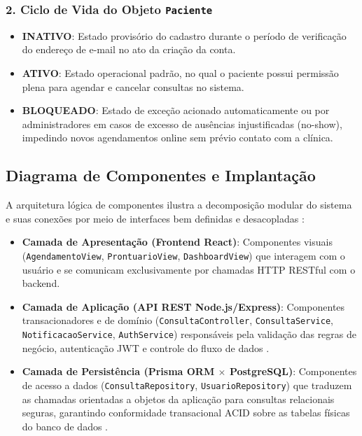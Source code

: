 \subsubsection{2. Ciclo de Vida do Objeto \texttt{Paciente}}
\begin{itemize}
    \item \textbf{INATIVO}: Estado provisório do cadastro durante o período de verificação do endereço de e-mail no ato da criação da conta.
    \item \textbf{ATIVO}: Estado operacional padrão, no qual o paciente possui permissão plena para agendar e cancelar consultas no sistema.
    \item \textbf{BLOQUEADO}: Estado de exceção acionado automaticamente ou por administradores em casos de excesso de ausências injustificadas (no-show), impedindo novos agendamentos online sem prévio contato com a clínica.
\end{itemize}

\subsection{Diagrama de Componentes e Implantação}

A arquitetura lógica de componentes ilustra a decomposição modular do sistema e suas conexões por meio de interfaces bem definidas e desacopladas \cite{fowler2002}:
\begin{itemize}
    \item \textbf{Camada de Apresentação (Frontend React)}: Componentes visuais (\texttt{AgendamentoView}, \texttt{ProntuarioView}, \texttt{DashboardView}) que interagem com o usuário e se comunicam exclusivamente por chamadas HTTP RESTful com o backend.
    \item \textbf{Camada de Aplicação (API REST Node.js/Express)}: Componentes transacionadores e de domínio (\texttt{ConsultaController}, \texttt{ConsultaService}, \texttt{NotificacaoService}, \texttt{AuthService}) responsáveis pela validação das regras de negócio, autenticação JWT e controle do fluxo de dados \cite{martin2019}.
    \item \textbf{Camada de Persistência (Prisma ORM $\times$ PostgreSQL)}: Componentes de acesso a dados (\texttt{ConsultaRepository}, \texttt{UsuarioRepository}) que traduzem as chamadas orientadas a objetos da aplicação para consultas relacionais seguras, garantindo conformidade transacional ACID sobre as tabelas físicas do banco de dados \cite{silberschatz2020}.
\end{itemize}
